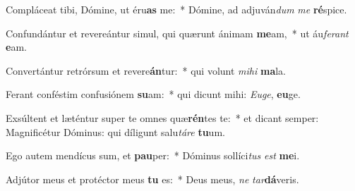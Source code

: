 \item Compláceat tibi, Dómine, ut éru\textbf{as} me:~* Dómine, ad adjuván\textit{dum} \textit{me} \textbf{ré}spice.
\item Confundántur et revereántur simul, qui quærunt ánimam \textbf{me}am,~* ut áu\textit{fe}\textit{rant} \textbf{e}am.
\item Convertántur retrórsum et revere\textbf{án}tur:~* qui volunt \textit{mi}\textit{hi} \textbf{ma}la.
\item Ferant conféstim confusiónem \textbf{su}am:~* qui dicunt mihi: \textit{Eu}\textit{ge}, \textbf{eu}ge.
\item Exsúltent et læténtur super te omnes quæ\textbf{rén}tes te:~* et dicant semper: Magnificétur Dóminus: qui díligunt salu\textit{tá}\textit{re} \textbf{tu}um.
\item Ego autem mendícus sum, et \textbf{pau}per:~* Dóminus sollíci\textit{tus} \textit{est} \textbf{me}i.
\item Adjútor meus et protéctor meus \textbf{tu} es:~* Deus meus, \textit{ne} \textit{tar}\textbf{dá}veris.
